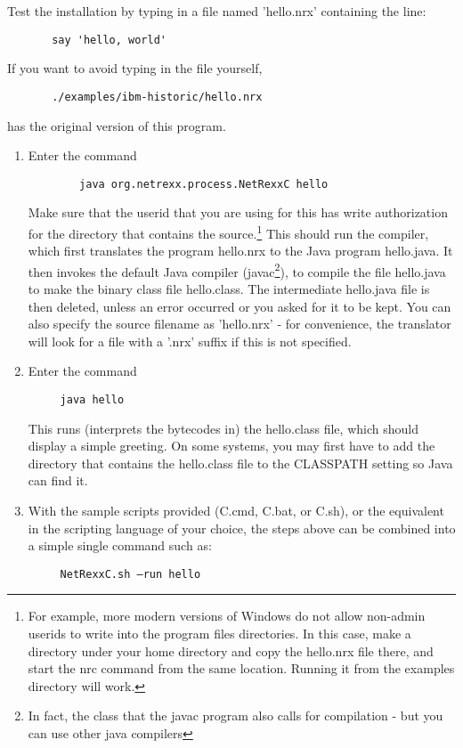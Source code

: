 Test the installation by typing in a file named 'hello.nrx' containing the line:
\begin{lstlisting} 
       say 'hello, world' 
\end{lstlisting}
 If you want to avoid typing in the file yourself,
\begin{lstlisting} 
       ./examples/ibm-historic/hello.nrx
\end{lstlisting}
has the original version of this program.
\begin{enumerate}
\item Enter the command
 \begin{lstlisting}
        java org.netrexx.process.NetRexxC hello
\end{lstlisting}
Make sure that the userid that you are using for this has write
authorization for the directory that contains the source.\footnote{For example,
more modern versions of Windows do not allow non-admin userids to
write into the program files directories. In this case, make a
directory under your home directory and copy the hello.nrx file there,
and start the nrc command from the same location. Running it from the
examples directory will work.}
This should run the \nr{} compiler, which first translates the
\nr{} program hello.nrx to the Java program hello.java. It then
invokes the default Java compiler (javac\footnote{In fact, the class
  that the javac program also calls for compilation - but you can use
  other java compilers}), to compile the file hello.java to make the
binary class file hello.class. The intermediate hello.java file is
then deleted, unless an error occurred or you asked for it to be
kept. You can also specify the source filename as 'hello.nrx' - for
convenience, the translator will look for a file with a '.nrx' suffix
if this is not specified.
\item Enter the command
 \begin{lstlisting} 
     java hello 
\end{lstlisting}
This runs (interprets the bytecodes in) the hello.class file, which should display a simple greeting. On some systems, you may first have to add the directory that contains the hello.class file to the CLASSPATH setting so Java can find it. 
\item With the sample scripts provided (\nr{}C.cmd, \nr{}C.bat, or \nr{}C.sh), or the equivalent in the scripting language of your choice, the steps above can be combined into a simple single command such as:
  \begin{lstlisting}
     NetRexxC.sh –run hello

\end{lstlisting}
\end{enumerate}
